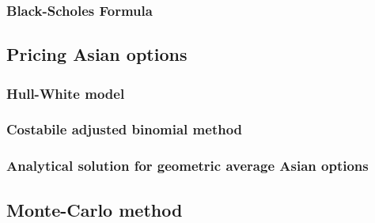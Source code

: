 \subsubsection{Black-Scholes Formula}

\subsection{Pricing Asian options}

\subsubsection{Hull-White model}

\subsubsection{Costabile adjusted binomial method}

\subsubsection{Analytical solution for geometric average Asian options}

\subsection{Monte-Carlo method}